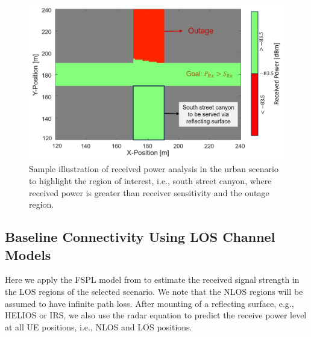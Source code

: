 \begin{figure}[H]
	\centering
	\includegraphics[width=1\linewidth]{images/Section 4 Images/Scenario2}
	\caption{Sample illustration of received power analysis in the urban scenario to highlight the region of interest, i.e., south street canyon, where received power is greater than receiver sensitivity and the outage region.}
	\label{fig:Scenario2}
\end{figure}
\subsection{Baseline Connectivity Using LOS Channel Models}\label{Baseline Performance of FSPL Model}
Here we apply the FSPL model from  to estimate the received signal strength in the LOS regions of the selected scenario. We note that the NLOS regions will be assumed to have infinite path loss. After mounting of a reflecting surface, e.g., HELIOS or IRS, we also use the radar equation  to predict the receive power level at all UE positions, i.e., NLOS and LOS positions. 

